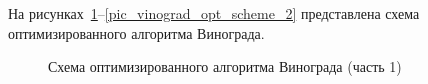На рисунках~\ref{pic_vinograd_opt_scheme_1}--\ref{pic_vinograd_opt_scheme_2} представлена схема оптимизированного алгоритма Винограда.

\begin{figure}[h!]
	\caption{Схема оптимизированного алгоритма Винограда (часть 1)}
	\label{pic_vinograd_opt_scheme_1}
\end{figure}
\clearpage

